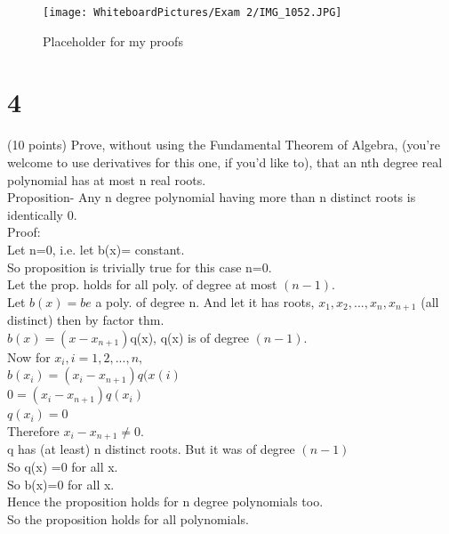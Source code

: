 \begin{figure}[h]\begin{center}\texttt{[image: WhiteboardPictures/Exam 2/IMG\_1052.JPG]}
\caption{Placeholder for my proofs} \label{fig:Euler_pic}\end{center}\end{figure} 

\section*{4}
(10 points) Prove, without using the Fundamental Theorem of Algebra, (you're welcome to use derivatives for this one, if you'd like to), that an nth degree real polynomial has at most n real roots. 
\\ 
Proposition- Any n degree polynomial having more than n distinct roots is identically 0. \\ 

Proof: \\ 
Let n=0, i.e. let b(x)= constant. \\ 
So proposition is trivially true for this case n=0. \\ 
Let the prop. holds for all poly. of degree at most $(n-1).$ \\ 
Let $b(x)=be$ a poly. of degree n. And let it has roots, $x_1, x_2, ..., x_n, x_{n+1}$ (all distinct) then by factor thm. \\ 
$b(x)=(x-x_{n+1})$q(x), q(x) is of degree $(n-1).$ \\ 
Now for $x_i, i=1,2,...,n,$ \\ 
$b(x_i)=(x_i -x_{n+1})q(x(i)$ \\ 
$0=(x_i-x_{n+1})q(x_i)$ \\ 
$q(x_i)=0$ \\ 
Therefore $x_i-x_{n+1} \neq 0.$ \\ 
q has (at least) n distinct roots. 
But it was of degree $(n-1)$\\ 
So q(x) =0 for all x. \\ 
So b(x)=0 for all x. \\ 
Hence the proposition holds for n degree polynomials too. \\ 
So the proposition holds for all polynomials. \\ 

